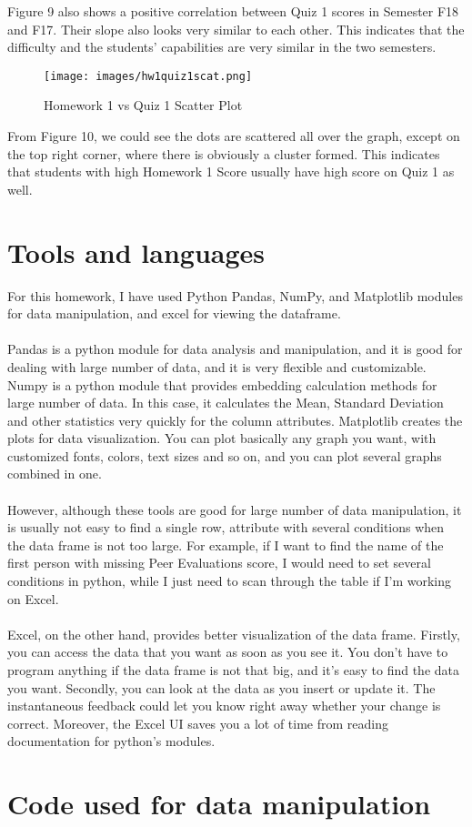 \documentclass{article}
\begin{document}
\begin{flushleft}
Figure 9 also shows a positive correlation between Quiz 1 scores in Semester F18 and F17. Their slope also looks very similar to each other. This indicates that the difficulty and the students' capabilities are very similar in the two semesters.
\end{flushleft}
\begin{figure}[h]
    \centering
    \texttt{[image: images/hw1quiz1scat.png]}
    \caption{Homework 1 vs Quiz 1 Scatter Plot}
\end{figure}
\noindent
\justifying
From Figure 10, we could see the dots are scattered all over the graph, except on the top right corner, where there is obviously a cluster formed. This indicates that students with high Homework 1 Score usually have high score on Quiz 1 as well.

\section{Tools and languages}
For this homework, I have used Python Pandas, NumPy, and Matplotlib modules for data manipulation, and excel for viewing the dataframe. \\\\
Pandas is a python module for data analysis and manipulation, and it is good for dealing with large number of data, and it is very flexible and customizable. Numpy is a python module that provides embedding calculation methods for large number of data. In this case, it calculates the Mean, Standard Deviation and other statistics very quickly for the column attributes. Matplotlib creates the plots for data visualization. You can plot basically any graph you want, with customized fonts, colors, text sizes and so on, and you can plot several graphs combined in one. \\\\
However, although these tools are good for large number of data manipulation, it is usually not easy to find a single row, attribute with several conditions when the data frame is not too large. For example, if I want to find the name of the first person with missing Peer Evaluations score, I would need to set several conditions in python, while I just need to scan through the table if I'm working on Excel. \\\\
Excel, on the other hand, provides better visualization of the data frame. Firstly, you can access the data that you want as soon as you see it. You don't have to program anything if the data frame is not that big, and it's easy to find the data you want. Secondly, you can look at the data as you insert or update it. The instantaneous feedback could let you know right away whether your change is correct. Moreover, the Excel UI saves you a lot of time from reading documentation for python's modules.

\section{Code used for data manipulation}

\end{document}
